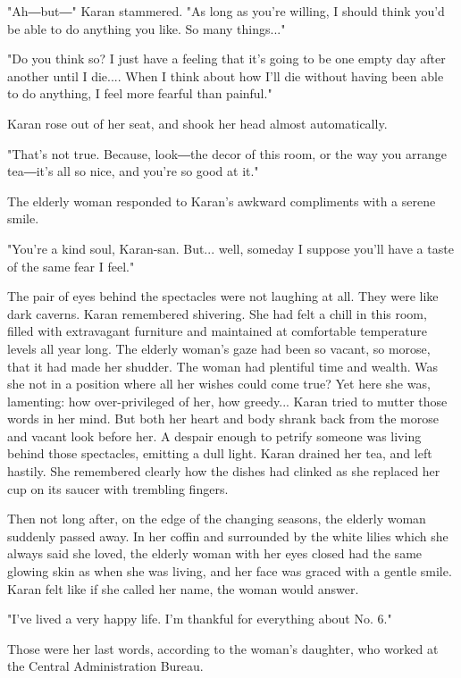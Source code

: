 "Ah―but―" Karan stammered. "As long as you're willing, I should think
you'd be able to do anything you like. So many things..."

"Do you think so? I just have a feeling that it's going to be one empty
day after another until I die.... When I think about how I'll die
without having been able to do anything, I feel more fearful than
painful."

Karan rose out of her seat, and shook her head almost automatically.

"That's not true. Because, look―the decor of this room, or the way you
arrange tea―it's all so nice, and you're so good at it."

The elderly woman responded to Karan's awkward compliments with a serene
smile.

"You're a kind soul, Karan-san. But... well, someday I suppose you'll
have a taste of the same fear I feel."

The pair of eyes behind the spectacles were not laughing at all. They
were like dark caverns. Karan remembered shivering. She had felt a chill
in this room, filled with extravagant furniture and maintained at
comfortable temperature levels all year long. The elderly woman's gaze
had been so vacant, so morose, that it had made her shudder. The woman
had plentiful time and wealth. Was she not in a position where all her
wishes could come true? Yet here she was, lamenting: how over-privileged
of her, how greedy... Karan tried to mutter those words in her mind. But
both her heart and body shrank back from the morose and vacant look
before her. A despair enough to petrify someone was living behind those
spectacles, emitting a dull light. Karan drained her tea, and left
hastily. She remembered clearly how the dishes had clinked as she
replaced her cup on its saucer with trembling fingers.

Then not long after, on the edge of the changing seasons, the elderly
woman suddenly passed away. In her coffin and surrounded by the white
lilies which she always said she loved, the elderly woman with her eyes
closed had the same glowing skin as when she was living, and her face
was graced with a gentle smile. Karan felt like if she called her name,
the woman would answer.

"I've lived a very happy life. I'm thankful for everything about No. 6."

Those were her last words, according to the woman's daughter, who worked
at the Central Administration Bureau.


